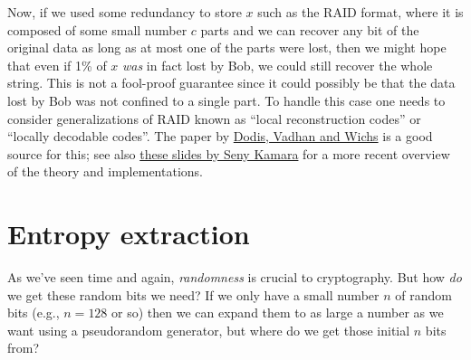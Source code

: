 Now, if we used some redundancy to store \(x\) such as the RAID format,
where it is composed of some small number \(c\) parts and we can recover
any bit of the original data as long as at most one of the parts were
lost, then we might hope that even if 1\% of \(x\) \emph{was} in fact
lost by Bob, we could still recover the whole string. This is not a
fool-proof guarantee since it could possibly be that the data lost by
Bob was not confined to a single part. To handle this case one needs to
consider generalizations of RAID known as ``local reconstruction codes''
or ``locally decodable codes''. The paper by
\href{http://www.people.seas.harvard.edu/~salil/research/PoR-tcc09.pdf}{Dodis,
Vadhan and Wichs} is a good source for this; see also
\href{http://research.microsoft.com/en-us/um/people/senyk/slides/pos-cai.pdf}{these
slides by Seny Kamara} for a more recent overview of the theory and
implementations.

\section{Entropy extraction}\label{Entropy-extraction}

As we've seen time and again, \emph{randomness} is crucial to
cryptography. But how \emph{do} we get these random bits we need? If we
only have a small number \(n\) of random bits (e.g., \(n=128\) or so)
then we can expand them to as large a number as we want using a
pseudorandom generator, but where do we get those initial \(n\) bits
from?

